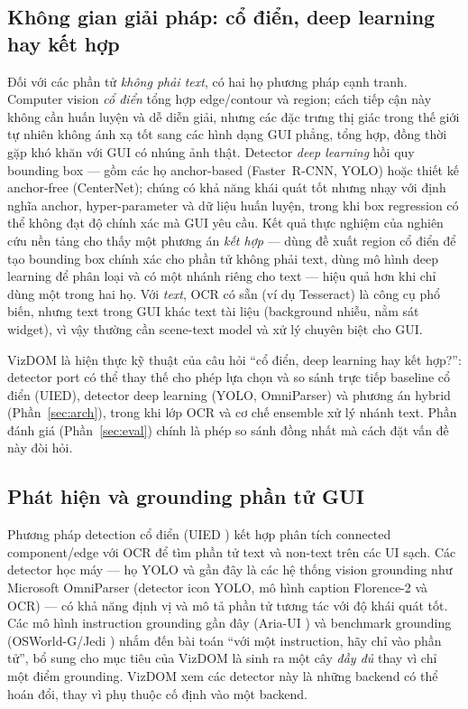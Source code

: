 \documentclass[11pt,a4paper]{article}
\begin{document}
\subsection{Không gian giải pháp: cổ điển, deep learning hay kết hợp}
Đối với các phần tử \emph{không phải text}, có hai họ phương pháp cạnh tranh.
Computer vision \emph{cổ điển} tổng hợp edge/contour và region; cách tiếp cận này
không cần huấn luyện và dễ diễn giải, nhưng các đặc trưng thị giác trong thế giới tự
nhiên không ánh xạ tốt sang các hình dạng GUI phẳng, tổng hợp, đồng thời gặp khó
khăn với GUI có nhúng ảnh thật. Detector \emph{deep learning} hồi quy bounding box
--- gồm các họ anchor-based (Faster~R-CNN, YOLO) hoặc thiết kế anchor-free
(CenterNet); chúng có khả năng khái quát tốt nhưng nhạy với định nghĩa anchor,
hyper-parameter và dữ liệu huấn luyện, trong khi box regression có thể không đạt độ
chính xác mà GUI yêu cầu. Kết quả thực nghiệm của nghiên cứu nền tảng
\cite{xie2020uied} cho thấy một phương án \emph{kết hợp} --- dùng đề xuất region cổ
điển để tạo bounding box chính xác cho phần tử không phải text, dùng mô hình deep
learning để phân loại và có một nhánh riêng cho text --- hiệu quả hơn khi chỉ dùng
một trong hai họ. Với \emph{text}, OCR có sẵn (ví dụ Tesseract) là công cụ phổ biến,
nhưng text trong GUI khác text tài liệu (background nhiễu, nằm sát widget), vì vậy
thường cần scene-text model và xử lý chuyên biệt cho GUI.

VizDOM là hiện thực kỹ thuật của câu hỏi ``cổ điển, deep learning hay kết hợp?'':
detector port có thể thay thế cho phép lựa chọn và so sánh trực tiếp baseline cổ
điển (UIED), detector deep learning (YOLO, OmniParser) và phương án hybrid
(Phần~\ref{sec:arch}), trong khi lớp OCR và cơ chế ensemble xử lý nhánh text. Phần
đánh giá (Phần~\ref{sec:eval}) chính là phép so sánh đồng nhất mà cách đặt vấn đề này
đòi hỏi.

\subsection{Phát hiện và grounding phần tử GUI}
Phương pháp detection cổ điển (UIED \cite{xie2020uied}) kết hợp phân tích connected
component/edge với OCR để tìm phần tử text và non-text trên các UI sạch. Các
detector học máy --- họ YOLO \cite{ultralytics} và gần đây là các hệ thống vision
grounding như Microsoft OmniParser \cite{omniparser2024} (detector icon YOLO, mô
hình caption Florence-2 \cite{florence2} và OCR) --- có khả năng định vị và mô tả
phần tử tương tác với độ khái quát tốt. Các mô hình instruction grounding gần đây
(Aria-UI \cite{ariaui2024}) và benchmark grounding (OSWorld-G/Jedi
\cite{osworldg}) nhắm đến bài toán ``với một instruction, hãy chỉ vào phần tử'', bổ
sung cho mục tiêu của VizDOM là sinh ra một cây \emph{đầy đủ} thay vì chỉ một điểm
grounding. VizDOM xem các detector này là những backend có thể hoán đổi, thay vì
phụ thuộc cố định vào một backend.
\end{document}
